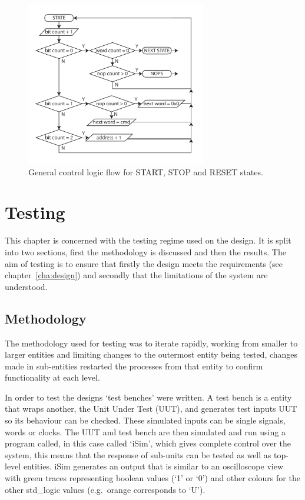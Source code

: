 \begin{figure}[htbp]
  \centering
  \includegraphics[width=0.7\textwidth]{images/pdfs/tx_sm_bram_control_flow.pdf}
  \caption{General control logic flow for START, STOP and RESET states.}
  \label{fig:tx_sm_bram_control_flow}
\end{figure}

\chapter{Testing} %
\label{cha:testing}
This chapter is concerned with the testing regime used on the design. It is split into two sections, first the methodology is discussed and then the results. The aim of testing is to ensure that firstly the design meets the requirements (see chapter~\ref{cha:design}) and secondly that the limitations of the system are understood.
\section{Methodology} %
\label{sec:methodology}
The methodology used for testing was to iterate rapidly, working from smaller to larger entities and limiting changes to the outermost entity being tested, changes made in sub-entities restarted the processes from that entity to confirm functionality at each level. 

In order to test the designs `test benches' were written. A test bench is a entity that wraps another, the Unit Under Test (UUT), and generates test inputs UUT so its behaviour can be checked. These simulated inputs can be single signals, words or clocks. The UUT and test bench are then simulated and run using a program called, in this case called `iSim', which gives complete control over the system, this means that the response of sub-units can be tested as well as top-level entities. iSim generates an output that is similar to an oscilloscope view with green traces representing boolean values (`1' or `0') and other colours for the other std\_logic values (e.g.\ orange corresponds to `U'). 

